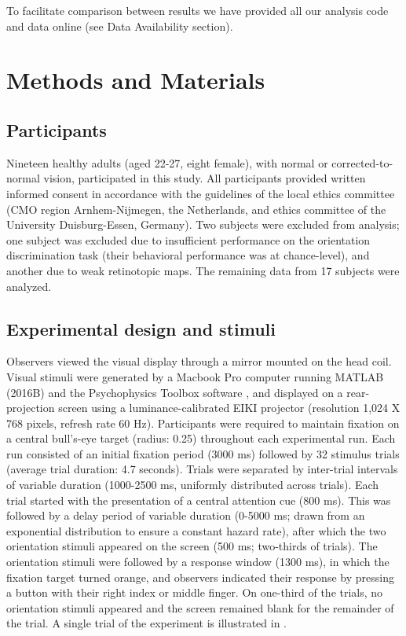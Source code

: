 \documentclass[9pt,lineno]{aperture}
\begin{document}
To facilitate comparison between results we have provided all our analysis code and data online (see Data Availability section).

\section{Methods and Materials}
\label{sec:methods}
\subsection{Participants}
Nineteen healthy adults (aged 22-27, eight female), with normal or corrected-to-normal vision, participated in this study. All participants provided written informed consent in accordance with the guidelines of the local ethics committee (CMO region Arnhem-Nijmegen, the Netherlands, and ethics committee of the University Duisburg-Essen, Germany). Two subjects were excluded from analysis; one subject was excluded due to insufficient performance on the orientation discrimination task (their behavioral performance was at chance-level), and another due to weak retinotopic maps. The remaining data from 17 subjects were analyzed.

\subsection{Experimental design and stimuli}
\label{sec:examples}

Observers viewed the visual display through a mirror mounted on the head coil. Visual stimuli were generated by a Macbook Pro computer running MATLAB (2016B) and the Psychophysics Toolbox software \citep{Brainard1997,Pelli1997}, and displayed on a rear-projection screen using a luminance-calibrated EIKI projector (resolution 1,024 X 768 pixels, refresh rate 60 Hz).
Participants were required to maintain fixation on a central bull's-eye target (radius: 0.25\textdegree) throughout each experimental run. Each run consisted of an initial fixation period (3000 ms) followed by 32 stimulus trials (average trial duration: 4.7 seconds). Trials were separated by inter-trial intervals of variable duration (1000-2500 ms, uniformly distributed across trials). Each trial started with the presentation of a central attention cue (800 ms). This was followed by a delay period of variable duration (0-5000 ms; drawn from an exponential distribution to ensure a constant hazard rate), after which the two orientation stimuli appeared on the screen (500 ms; two-thirds of trials). The orientation stimuli were followed by a response window (1300 ms), in which the fixation target turned orange, and observers indicated their response by pressing a button with their right index or middle finger. On one-third of the trials, no orientation stimuli appeared and the screen remained blank for the remainder of the trial. A single trial of the experiment is illustrated in .
\end{document}

